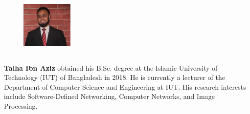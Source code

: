 \documentclass{article}
\begin{document}
	
	\begin{figure} 
		\includegraphics[width=1in,height=1.25in,clip,keepaspectratio]{cv.jpg}
	\end{figure}\par
	\textbf{Talha Ibn Aziz} obtained his B.Sc. degree at the Islamic University of Technology (IUT) of Bangladesh in 2018. He is currently a lecturer of the Department of Computer Science and Engineering at IUT. His research interests include Software-Defined Networking, Computer Networks, and Image Processing.\par
\end{document}
